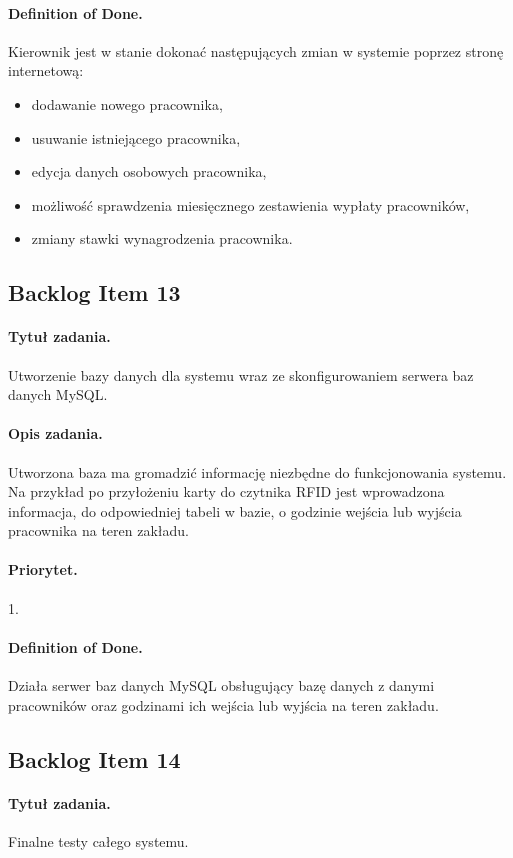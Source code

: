 \documentclass[a4paper]{article}
\begin{document}
\paragraph{Definition of Done.} Kierownik jest w stanie dokonać następujących zmian w systemie poprzez stronę internetową:
\begin{itemize}
\item dodawanie nowego pracownika,
\item usuwanie istniejącego pracownika,
\item edycja danych osobowych pracownika,
\item możliwość sprawdzenia miesięcznego zestawienia wypłaty pracowników,
\item zmiany stawki wynagrodzenia pracownika.
\end{itemize}

\subsection{Backlog Item 13}
\paragraph{Tytuł zadania.} Utworzenie bazy danych dla systemu wraz ze skonfigurowaniem serwera baz danych MySQL.
\paragraph{Opis zadania.} Utworzona baza ma gromadzić informację niezbędne do funkcjonowania systemu. Na przykład po przyłożeniu karty do czytnika RFID jest wprowadzona informacja, do odpowiedniej tabeli w bazie, o godzinie wejścia lub wyjścia pracownika na teren zakładu. 
\paragraph{Priorytet.} 1.
\paragraph{Definition of Done.} Działa serwer baz danych MySQL obsługujący bazę danych z danymi pracowników oraz godzinami ich wejścia lub wyjścia na teren zakładu. 

\subsection{Backlog Item 14}
\paragraph{Tytuł zadania.} Finalne testy całego systemu.
\end{document}
